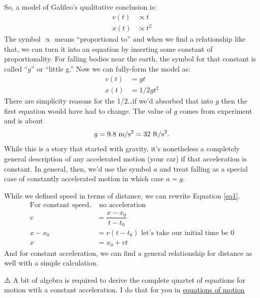\documentclass[
  letterpaper,
  DIV=11,
  numbers=noendperiod,
  oneside]{scrreprt}
\begin{document}
So, a model of Galileo's qualitative conclusion is: \[
\begin{align}
v(t) &\propto t \nonumber \\
x(t) &\propto t^2 \nonumber
\end{align}
\] The symbol \(\propto\) means ``proportional to'' and when we find a
relationship like that, we can turn it into an equation by inserting
some constant of proportionality. For falling bodies near the earth, the
symbol for that constant is called ``\(g\)'' or ``little g.'' Now we can
fully-form the model as: \[
\begin{align}
v(t) &= gt \nonumber \\
x(t) &= 1/2gt^2 \nonumber
\end{align}
\] There are simplicity reasons for the 1/2\ldots if we'd absorbed that
into \(g\) then the first equation would have had to change. The value
of \(g\) comes from experiment and is about \[
\begin{equation}
g = 9.8 \text{ m/s$^2$} = 32 \text{ ft/s$^2$}.  \nonumber \\
\end{equation}
\] While this is a story that started with gravity, it's nonetheless a
completely general description of any accelerated motion (your car) if
that acceleration is constant. In general, then, we'd use the symbol
\(a\) and treat falling as a special case of constantly accelerated
motion in which case \(a=g\).

While we defined speed in terms of distance, we can rewrite Equation
\ref{eq1}. \[
\begin{align}
\text{For constant speed,}&\text{ no acceleration} \\
v &=\dfrac{x-x_0}{t-t_0} \nonumber \\
x-x_0 &=v(t-t_0) \nonumber \text{ let's take our initial time be 0} \\
x &= x_0 + vt
\end{align}
\] And for constant acceleration, we can find a general relationship for
distance as well with a simple calculation.

\begin{tcolorbox}[enhanced jigsaw, toprule=.15mm, opacityback=0, colframe=quarto-callout-warning-color-frame, rightrule=.15mm, coltitle=black, bottomtitle=1mm, colbacktitle=quarto-callout-warning-color!10!white, bottomrule=.15mm, toptitle=1mm, titlerule=0mm, title={Warning}, arc=.35mm, leftrule=.75mm, left=2mm, colback=white, breakable, opacitybacktitle=0.6]

⚠️ A bit of algebra is required to derive the complete quartet of
equations for motion with a constant acceleration. I do that for you in
\href{./Motion_equations.qmd}{equations of motion}

\end{tcolorbox}
\end{document}
